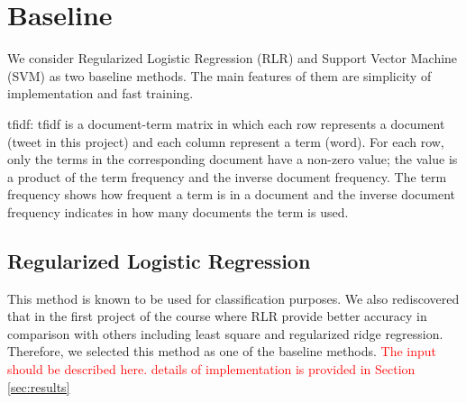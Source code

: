 \documentclass[8pt,conference,compsocconf]{IEEEtran}
\begin{document}
\section{Baseline} \label{sec:baseline}

We consider Regularized Logistic Regression (RLR) and Support Vector Machine (SVM) as two baseline methods. The main features of them are simplicity of implementation and fast training.

tfidf: tfidf is a document-term matrix in which each row represents a document (tweet in this project) and each column represent a term (word). For each row, only the terms in the corresponding document have a non-zero value; the value is a product of the term frequency and the inverse document frequency. The term frequency shows how frequent a term is in a document and the inverse document frequency indicates in how many documents the term is used.

\subsection{Regularized Logistic Regression}
This method is known to be used for classification purposes. We also rediscovered that in the first project of the course where RLR provide better accuracy in comparison with others including least square and regularized ridge regression. Therefore, we selected this method as one of the baseline methods. \textcolor{red}{The input should be described here. details of implementation is provided in Section \ref{sec:results}}
\end{document}
